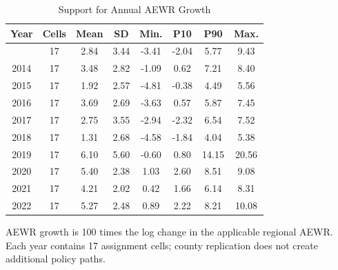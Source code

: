 \begin{table}[!htbp]
\caption*{
{\large Support for Annual AEWR Growth}
} 

\fontsize{10.0pt}{12.0pt}\selectfont

\begin{tabular*}{1.0\linewidth}{@{\extracolsep{\fill}}cccccccc}
\toprule
Year & Cells & Mean & SD & Min. & P10 & P90 & Max. \\ 
\midrule\addlinespace[2.5pt]
2013 & 17 & 2.84 & 3.44 & -3.41 & -2.04 & 5.77 & 9.43 \\
2014 & 17 & 3.48 & 2.82 & -1.09 & 0.62 & 7.21 & 8.40 \\
2015 & 17 & 1.92 & 2.57 & -4.81 & -0.38 & 4.49 & 5.56 \\
2016 & 17 & 3.69 & 2.69 & -3.63 & 0.57 & 5.87 & 7.45 \\
2017 & 17 & 2.75 & 3.55 & -2.94 & -2.32 & 6.54 & 7.52 \\
2018 & 17 & 1.31 & 2.68 & -4.58 & -1.84 & 4.04 & 5.38 \\
2019 & 17 & 6.10 & 5.60 & -0.60 & 0.80 & 14.15 & 20.56 \\
2020 & 17 & 5.40 & 2.38 & 1.03 & 2.60 & 8.51 & 9.08 \\
2021 & 17 & 4.21 & 2.02 & 0.42 & 1.66 & 6.14 & 8.31 \\
2022 & 17 & 5.27 & 2.48 & 0.89 & 2.22 & 8.21 & 10.08 \\
\bottomrule
\end{tabular*}
\begin{minipage}{\linewidth}
AEWR growth is 100 times the log change in the applicable regional AEWR. Each year contains 17 assignment cells; county replication does not create additional policy paths.\\
\end{minipage}
\end{table}
